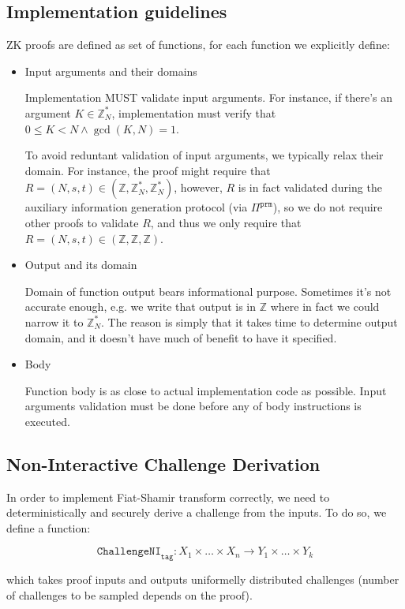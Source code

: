 \documentclass[11pt]{article}
\newcommand{\proof}[1]{\ensuremath{\Pi^{\mathtt{#1}}}}
\newcommand{\challengeni}[1]{\ensuremath{\mathtt{ChallengeNI}_{\mathtt{#1}}}}
\newcommand{\Z}{\mathbb{Z}}
\newcommand{\?}[1]{\stackrel{?}{#1}}
\begin{document}
\subsection{Implementation guidelines}
ZK proofs are defined as set of functions, for each function we explicitly define:
\begin{itemize}
\item Input arguments and their domains

Implementation MUST validate input arguments. For instance, if there's an argument $K \in \Z_N^*$, implementation must verify that $0 \le K < N \land \gcd(K, N) = 1$.

To avoid reduntant validation of input arguments, we typically relax their domain. For instance, the proof might require that $R = (N, s, t) \in (\Z, \Z^*_N, \Z^*_N)$, however, $R$ is in fact validated during the auxiliary information generation protocol (via $\proof{prm}$), so we do not require other proofs to validate $R$, and thus we only require that $R = (N, s, t) \in (\Z, \Z, \Z)$.

\item Output and its domain

Domain of function output bears informational purpose. Sometimes it's not accurate enough, e.g. we write that output is in $\Z$ where in fact we could narrow it to $\Z^*_N$. The reason is simply that it takes time to determine output domain, and it doesn't have much of benefit to have it specified.

\item Body

Function body is as close to actual implementation code as possible. Input arguments validation must be done before any of body instructions is executed.
\end{itemize}

\subsection{Non-Interactive Challenge Derivation}
In order to implement Fiat-Shamir transform correctly, we need to deterministically and securely derive a challenge
from the inputs. To do so, we define a function:

$$\challengeni{tag} : X_1 \times \dots \times X_n \to Y_1 \times \dots \times Y_k$$

which takes proof inputs and outputs uniformelly distributed challenges (number of challenges to be
sampled depends on the proof).
\end{document}
